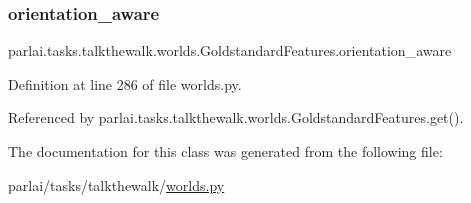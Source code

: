 \subsubsection{\texorpdfstring{orientation\+\_\+aware}{orientation\_aware}}
{\footnotesize\ttfamily parlai.\+tasks.\+talkthewalk.\+worlds.\+Goldstandard\+Features.\+orientation\+\_\+aware}



Definition at line 286 of file worlds.\+py.



Referenced by parlai.\+tasks.\+talkthewalk.\+worlds.\+Goldstandard\+Features.\+get().



The documentation for this class was generated from the following file\+:\begin{DoxyCompactItemize}
\item 
parlai/tasks/talkthewalk/\hyperlink{parlai_2tasks_2talkthewalk_2worlds_8py}{worlds.\+py}\end{DoxyCompactItemize}
